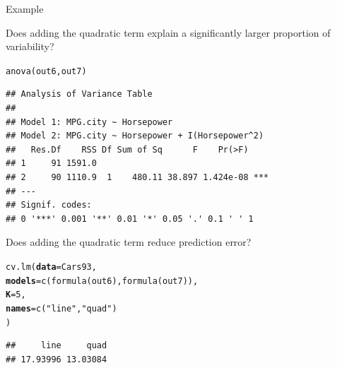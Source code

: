 \documentclass{beamer}\usepackage[]{graphicx}\usepackage[]{color}
\makeatletter
\newcommand{\hlnum}[1]{\textcolor[rgb]{0.69,0.494,0}{#1}}%
\newcommand{\hlstr}[1]{\textcolor[rgb]{0.749,0.012,0.012}{#1}}%
\newcommand{\hlstd}[1]{\textcolor[rgb]{0,0,0}{#1}}%
\newcommand{\hlkwc}[1]{\textcolor[rgb]{0,0,0}{\textbf{#1}}}%
\newcommand{\hlkwd}[1]{\textcolor[rgb]{0.004,0.004,0.506}{#1}}%
\newenvironment{kframe}{%
 \def\at@end@of@kframe{}%
 \ifinner\ifhmode%
  \def\at@end@of@kframe{\end{minipage}}%
  \begin{minipage}{\columnwidth}%
 \fi\fi%
 \def\FrameCommand##1{\hskip\@totalleftmargin \hskip-\fboxsep
 \colorbox{shadecolor}{##1}\hskip-\fboxsep
     \hskip-\linewidth \hskip-\@totalleftmargin \hskip\columnwidth}%
 \MakeFramed {\advance\hsize-\width
   \@totalleftmargin\z@ \linewidth\hsize
   \@setminipage}}%
 {\par\unskip\endMakeFramed%
 \at@end@of@kframe}
\newenvironment{knitrout}{}{} %
\makeatother
\begin{document}
\begin{frame}{Example}

Does adding the quadratic term explain a significantly larger proportion of
variability?
\begin{knitrout}\footnotesize
{}\color{fgcolor}\begin{kframe}
\begin{alltt}
\hlkwd{anova}\hlstd{(out6, out7)}
\end{alltt}
\begin{verbatim}
## Analysis of Variance Table
## 
## Model 1: MPG.city ~ Horsepower
## Model 2: MPG.city ~ Horsepower + I(Horsepower^2)
##   Res.Df    RSS Df Sum of Sq      F    Pr(>F)    
## 1     91 1591.0                                  
## 2     90 1110.9  1    480.11 38.897 1.424e-08 ***
## ---
## Signif. codes:  
## 0 '***' 0.001 '**' 0.01 '*' 0.05 '.' 0.1 ' ' 1
\end{verbatim}
\end{kframe}
\end{knitrout}

\pagebreak

Does adding the quadratic term reduce prediction error?
\begin{knitrout}\footnotesize
{}\color{fgcolor}\begin{kframe}
\begin{alltt}
\hlkwd{cv.lm}\hlstd{(}\hlkwc{data}   \hlstd{= Cars93,}
      \hlkwc{models} \hlstd{=} \hlkwd{c}\hlstd{(}\hlkwd{formula}\hlstd{(out6),} \hlkwd{formula}\hlstd{(out7)),}
      \hlkwc{K}      \hlstd{=} \hlnum{5}\hlstd{,}
      \hlkwc{names}  \hlstd{=} \hlkwd{c}\hlstd{(}\hlstr{"line"}\hlstd{,} \hlstr{"quad"}\hlstd{)}
      \hlstd{)}
\end{alltt}
\begin{verbatim}
##     line     quad 
## 17.93996 13.03084
\end{verbatim}
\end{kframe}
\end{knitrout}

\end{frame}

\end{document}
